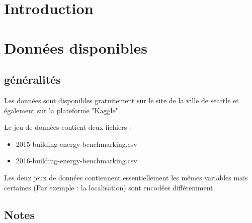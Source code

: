 
\section{Introduction}



\section{Données disponibles}

\subsection{généralités}

Les données sont disponibles gratuitement sur le site de la ville de seattle et
également sur la plateforme "Kaggle".

Le jeu de données contient deux fichiers :
\begin{itemize}
  \item{2015-building-energy-benchmarking.csv}
  \item{2016-building-energy-benchmarking.csv}
\end{itemize}

Les deux jeux de données contiennent essentiellement les mêmes variables mais
certaines (Par exemple : la localisation) sont encodées différemment.

\subsection{Notes}

